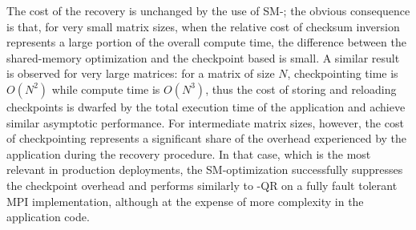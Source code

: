 The cost of the \abft recovery is unchanged by the use of SM-\cof; the
obvious consequence is that, for very small matrix sizes, when the
relative cost of \abft checksum inversion represents a large portion of
the overall compute time, the difference between the shared-memory
optimization and the checkpoint based \cof is small. A similar result is
observed for very large matrices: for a matrix of size $N$,
checkpointing time is $O(N^2)$ while compute time is $O(N^3)$, thus 
the cost of storing and reloading checkpoints is dwarfed by the total 
execution time of the application and achieve similar asymptotic 
performance. 
For intermediate matrix sizes, however, the cost of checkpointing
represents a significant share of the overhead experienced by the
application during the recovery procedure. In that case, which is the
most relevant in production deployments, the SM-\cof optimization
successfully suppresses the checkpoint overhead and performs similarly to
\abft-QR on a fully fault tolerant MPI implementation, although at the
expense of more complexity in the application code.

